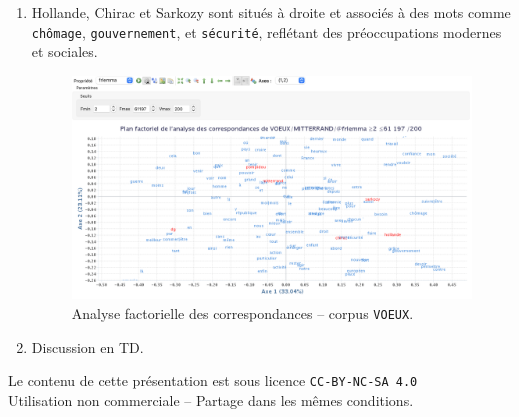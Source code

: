 \documentclass[xcolor={table,usenames,dvipsnames}]{article}
\begin{document}
\begin{enumerate}
 	\item Hollande, Chirac et Sarkozy sont situés à droite et associés à des mots comme \texttt{chômage}, \texttt{gouvernement}, et \texttt{sécurité}, reflétant des préoccupations modernes et sociales.
 	 	 	\begin{figure}[!h] %
 		\centering
 		\includegraphics[width=1\linewidth]{img/afc.png}
 		\caption{Analyse factorielle des correspondances -- corpus \texttt{VOEUX}.}
 		\label{fig:usa_algerie}
 	\end{figure}
 	
 	\item Discussion en TD.

\end{enumerate}
 
 	
\hline 

		\printbibliography


	\centering
{\small Le contenu de cette présentation est sous licence \texttt{CC-BY-NC-SA 4.0}\\Utilisation non commerciale -- Partage dans les mêmes conditions.\\}
\href{https://creativecommons.org/licenses/by-nc-sa/4.0/deed.fr}{\ccbyncsa}
	
\end{document}
